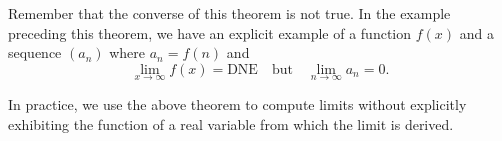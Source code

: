 \documentclass{ximera}
\begin{document}
\begin{warning}
Remember that the converse of this theorem is not
true.  In the example preceding this theorem, we have an explicit example of a function $f(x)$ and a sequence $(a_n)$ where $a_n
=f(n)$ and
\[
\lim\limits_{x\to\infty}f(x)=\text{DNE} \quad\text{but} \quad \lim\limits_{n\to\infty} a_n = 0.
\]
\end{warning}

In practice, we use the above theorem to compute limits without explicitly exhibiting the function of a real variable from which the limit is derived.  
\end{document}
